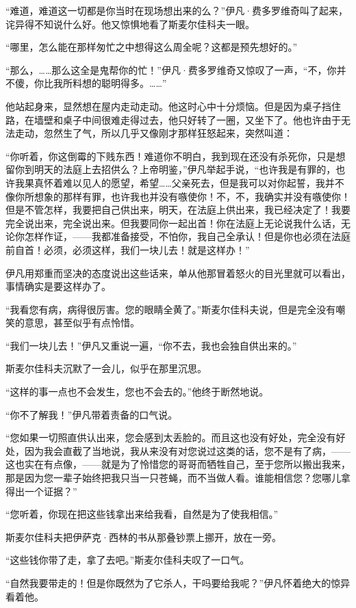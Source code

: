 \par “难道，难道这一切都是你当时在现场想出来的么？”伊凡·费多罗维奇叫了起来，诧异得不知说什么好。他又惊惧地看了斯麦尔佳科夫一眼。
\par “哪里，怎么能在那样匆忙之中想得这么周全呢？这都是预先想好的。”
\par “那么，……那么这全是鬼帮你的忙！”伊凡·费多罗维奇又惊叹了一声，“不，你并不傻，你比我所料想的聪明得多。……”
\par 他站起身来，显然想在屋内走动走动。他这时心中十分烦恼。但是因为桌子挡住路，在墙壁和桌子中间很难走得过去，他只好转了一圈，又坐下了。他也许由于无法走动，忽然生了气，所以几乎又像刚才那样狂怒起来，突然叫道：
\par “你听着，你这倒霉的下贱东西！难道你不明白，我到现在还没有杀死你，只是想留你到明天的法庭上去招供么？上帝明鉴，”伊凡举起手说，“也许我是有罪的，也许我果真怀着难以见人的愿望，希望……父亲死去，但是我可以对你起誓，我并不像你所想象的那样有罪，也许我也并没有嗾使你！不，不，我确实并没有嗾使你！但是不管怎样，我要把自己供出来，明天，在法庭上供出来，我已经决定了！我要完全说出来，完全说出来。但我要同你一起出首！你在法庭上无论说我什么话，无论你怎样作证，——我都准备接受，不怕你，我自己全承认！但是你也必须在法庭前自首！必须，必须这样，我们一块儿去！就是这样办！”
\par 伊凡用郑重而坚决的态度说出这些话来，单从他那冒着怒火的目光里就可以看出，事情确实是要这样办了。
\par “我看您有病，病得很厉害。您的眼睛全黄了。”斯麦尔佳科夫说，但是完全没有嘲笑的意思，甚至似乎有点怜惜。
\par “我们一块儿去！”伊凡又重说一遍，“你不去，我也会独自供出来的。”
\par 斯麦尔佳科夫沉默了一会儿，似乎在那里沉思。
\par “这样的事一点也不会发生，您也不会去的。”他终于断然地说。
\par “你不了解我！”伊凡带着责备的口气说。
\par “您如果一切照直供认出来，您会感到太丢脸的。而且这也没有好处，完全没有好处，因为我会直截了当地说，我从来没有对您说过这类的话，您不是有了病，——这也实在有点像，——就是为了怜惜您的哥哥而牺牲自己，至于您所以搬出我来，那是因为您一辈子始终把我只当一只苍蝇，而不当做人看。谁能相信您？您哪儿拿得出一个证据？”
\par “您听着，你现在把这些钱拿出来给我看，自然是为了使我相信。”
\par 斯麦尔佳科夫把伊萨克·西林的书从那叠钞票上挪开，放在一旁。
\par “这些钱你带了走，拿了去吧。”斯麦尔佳科夫叹了一口气。
\par “自然我要带走的！但是你既然为了它杀人，干吗要给我呢？”伊凡怀着绝大的惊异看着他。
